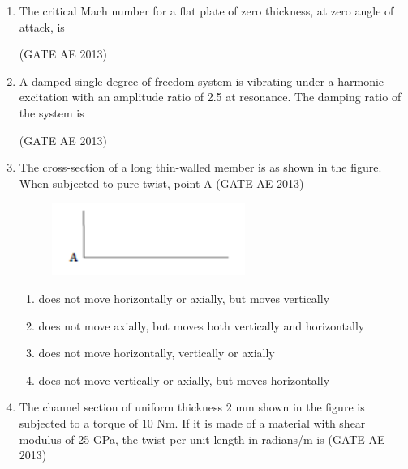 \documentclass[journal,12pt,onecolumn]{IEEEtran}
\theoremstyle{remark}
\begin{document}
\begin{flushleft}
\begin{enumerate}
\item The critical Mach number for a flat plate of zero thickness, at zero angle of attack, is \underline{\hspace{3cm}}

\hfill(GATE AE 2013)

\item A damped single degree-of-freedom system is vibrating under a harmonic excitation with an amplitude ratio of 2.5 at resonance. The damping ratio of the system is \underline{\hspace{3cm}}

\hfill(GATE AE 2013)

\item The cross-section of a long thin-walled member is as shown in the figure. When subjected to pure twist, point A \underline{\hspace{3cm}}
\hfill(GATE AE 2013)

\begin{figure}[H]
    \centering
    \includegraphics[width=0.5\columnwidth]{figs/16.png}
    \caption{}
    \label{fig:placeholder}
\end{figure}
\begin{multicols}{2}
\begin{enumerate}
    \item does not move horizontally or axially, but moves vertically
    \item does not move axially, but moves both vertically and horizontally
    \item does not move horizontally, vertically or axially
    \item does not move vertically or axially, but moves horizontally
\end{enumerate}
\end{multicols}

\item The channel section of uniform thickness 2 mm shown in the figure is subjected to a torque of 10 Nm. If it is made of a material with shear modulus of 25 GPa, the twist per unit length in radians/m is \underline{\hspace{3cm}}
\hfill(GATE AE 2013)


\end{enumerate}
\end{flushleft}
\end{document}
